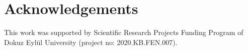 \section{Acknowledgements}
This work was supported by Scientific Research Projects Funding Program of Dokuz Eylül University (project no: 2020.KB.FEN.007).